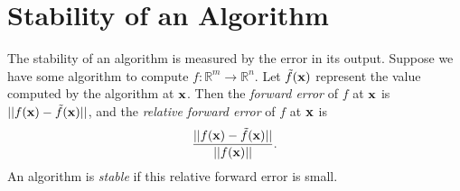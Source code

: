 %
%
%

\section*{Stability of an Algorithm}
The stability of an algorithm is measured by the error in its output.
Suppose we have some algorithm to compute $f: \mathbb{R}^m \rightarrow \mathbb{R}^n$.
Let $\tilde f({\bf x})$ represent the value computed by the algorithm at ${\bf x}$.
Then the \emph{forward error} of $f$ at ${\bf x}$ is $||f({\bf x})-\tilde f({\bf x})||$, and the \emph{relative forward error} of $f$ at ${\bf x}$ is
\[
\frac{||f({\bf x})-\tilde f({\bf x})||}{||f({\bf x})||}.
\]
An algorithm is \emph{stable} if this relative forward error is small.

